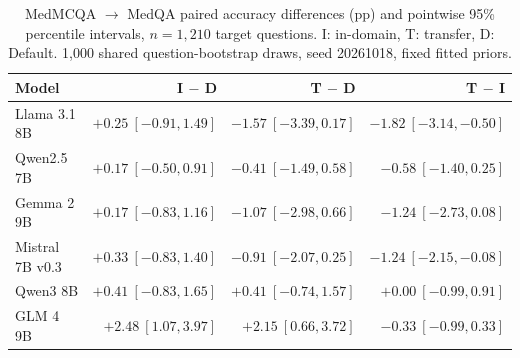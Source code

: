 \begin{table}[htbp]
\centering\small\setlength{\tabcolsep}{4pt}
\caption{MedMCQA $\rightarrow$ MedQA paired accuracy differences (pp) and pointwise 95\% percentile intervals, $n=1,210$ target questions. I: in-domain, T: transfer, D: Default. 1,000 shared question-bootstrap draws, seed 20261018, fixed fitted priors.}
\label{tab:intervals-medmcqa}
\begin{tabular}{lrrr}
\toprule
Model & I $-$ D & T $-$ D & T $-$ I\\
\midrule
Llama 3.1 8B & $+0.25~[-0.91,1.49]$ & $-1.57~[-3.39,0.17]$ & $-1.82~[-3.14,-0.50]$\\
Qwen2.5 7B & $+0.17~[-0.50,0.91]$ & $-0.41~[-1.49,0.58]$ & $-0.58~[-1.40,0.25]$\\
Gemma 2 9B & $+0.17~[-0.83,1.16]$ & $-1.07~[-2.98,0.66]$ & $-1.24~[-2.73,0.08]$\\
Mistral 7B v0.3 & $+0.33~[-0.83,1.40]$ & $-0.91~[-2.07,0.25]$ & $-1.24~[-2.15,-0.08]$\\
Qwen3 8B & $+0.41~[-0.83,1.65]$ & $+0.41~[-0.74,1.57]$ & $+0.00~[-0.99,0.91]$\\
GLM 4 9B & $+2.48~[1.07,3.97]$ & $+2.15~[0.66,3.72]$ & $-0.33~[-0.99,0.33]$\\
\bottomrule
\end{tabular}
\end{table}

